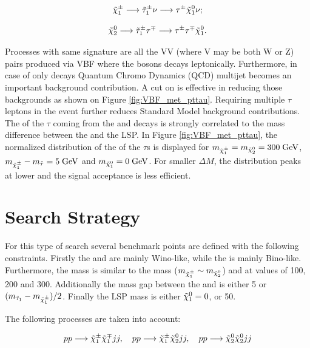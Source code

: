 \begin{equation}
\tilde{\chi}^{\pm}_{1} \longrightarrow \tilde{\tau}_{1}^{\pm} \nu \longrightarrow \tau^{\pm} \tilde{\chi}^{0}_{1} \nu ;
\end{equation}

\begin{equation}
\tilde{\chi}^{0}_{2} \longrightarrow \tilde{\tau}_{1}^{\pm} \tau^{\mp} \longrightarrow \tau^{\pm} \tau^{\mp} \tilde{\chi}^{0}_{1}.
\end{equation}

Processes with same signature are all the VV (where V may be both W or Z) pairs produced via VBF where the bosons decays leptonically. Furthermore, in case of only \hadtau decays Quantum Chromo Dynamics (QCD) multijet becomes an important background contribution. A cut on \met is effective in reducing those backgrounds as shown on Figure \ref{fig:VBF_met_pttau}. Requiring multiple $\tau$ leptons in the event further reduces Standard Model background contributions. The \pt of the \ensuremath{\tau} coming from the \charginopm and \neutralinotwo decays is strongly correlated to the mass difference between the \charginopm and the \neutralinoone LSP. In Figure \ref{fig:VBF_met_pttau}, the normalized distribution of the \pt of the \ensuremath{\tau}s is displayed for \ensuremath{m_{\charginopm} = m_{\neutralinotwo} = 300\gev}, \ensuremath{m_{\charginopm} - m_{\tilde{\tau}} = 5\gev} and \ensuremath{m_{\neutralinoone} = 0\gev}. For smaller \ensuremath{\Delta M}, the distribution peaks at lower \pt and the signal acceptance is less efficient.

\section {Search Strategy}
\label{section::search_strategy}

For this type of search several benchmark points are defined with the following constraints. Firstly the \charginopm and \neutralinotwo are mainly Wino-like, while the \neutralinoone is mainly Bino-like. Furthermore, the \charginopm mass is similar to the \neutralinotwo mass ($m_{\tilde{\chi}^{\pm}_{1}} \sim m_{\tilde{\chi}^{0}_{2}}$) and at values of 100, 200 and 300\gev. Additionally the mass gap between the \stau and \charginopm is either 5 \gev or $(m_{\tilde{\tau}_{1}} - m_{\tilde{\chi}^{\pm}_{1}})/2$. Finally the LSP mass is either $\tilde{\chi}^{0}_{1} = 0$, or 50\gev.

The following processes are taken into account:

\begin{equation}
pp \longrightarrow \tilde{\chi}^{\pm}_{1} \tilde{\chi}^{\mp}_{1} jj, \quad pp \longrightarrow \tilde{\chi}^{\pm}_{1} \tilde{\chi}^{0}_{2} jj, \quad pp \longrightarrow \tilde{\chi}^{0}_{2} \tilde{\chi}^{0}_{2} jj
\end{equation}

